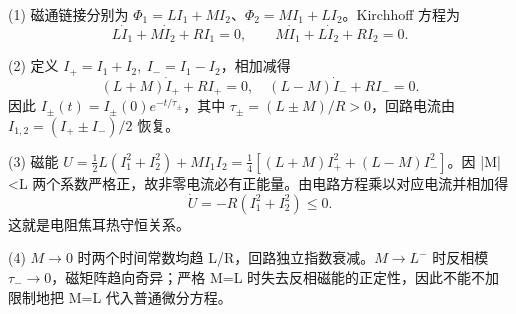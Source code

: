 (1) 磁通链接分别为 \(\Phi_1=LI_1+MI_2\)、\(\Phi_2=MI_1+LI_2\)。Kirchhoff 方程为
\[
L\dot I_1+M\dot I_2+RI_1=0,\qquad
M\dot I_1+L\dot I_2+RI_2=0.
\]

(2) 定义 \(I_+=I_1+I_2,\ I_-=I_1-I_2\)，相加减得
\[
(L+M)\dot I_++RI_+=0,\quad
(L-M)\dot I_-+RI_-=0.
\]
因此 \(I_\pm(t)=I_\pm(0)e^{-t/\tau_\pm}\)，其中 \(\tau_\pm=(L\pm M)/R>0\)，回路电流由 \(I_{1,2}=(I_+\pm I_-)/2\) 恢复。

(3) 磁能 \(U=\frac12L(I_1^2+I_2^2)+MI_1I_2=\frac14[(L+M)I_+^2+(L-M)I_-^2]\)。因 |M|<L 两个系数严格正，故非零电流必有正能量。由电路方程乘以对应电流并相加得
\[
\dot U=-R(I_1^2+I_2^2)\le0.
\]
这就是电阻焦耳热守恒关系。

(4) \(M\to 0\) 时两个时间常数均趋 L/R，回路独立指数衰减。\(M\to L^{-}\) 时反相模 \(\tau_-\to0\)，磁矩阵趋向奇异；严格 M=L 时失去反相磁能的正定性，因此不能不加限制地把 M=L 代入普通微分方程。

